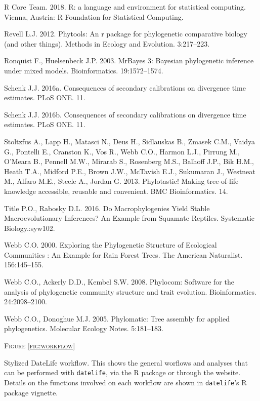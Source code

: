 \documentclass[]{article}
\begin{document}
\leavevmode\hypertarget{ref-RCoreTeam2018}{}%
R Core Team. 2018. R: a language and environment for statistical computing. Vienna, Austria: R Foundation for Statistical Computing.

\leavevmode\hypertarget{ref-Revell2012}{}%
Revell L.J. 2012. Phytools: An r package for phylogenetic comparative biology (and other things). Methods in Ecology and Evolution. 3:217--223.

\leavevmode\hypertarget{ref-Ronquist2003}{}%
Ronquist F., Huelsenbeck J.P. 2003. MrBayes 3: Bayesian phylogenetic inference under mixed models. Bioinformatics. 19:1572--1574.

\leavevmode\hypertarget{ref-schenk2016sec}{}%
Schenk J.J. 2016a. Consequences of secondary calibrations on divergence time estimates. PLoS ONE. 11.

\leavevmode\hypertarget{ref-Schenk2016}{}%
Schenk J.J. 2016b. Consequences of secondary calibrations on divergence time estimates. PLoS ONE. 11.

\leavevmode\hypertarget{ref-Stoltzfus2013}{}%
Stoltzfus A., Lapp H., Matasci N., Deus H., Sidlauskas B., Zmasek C.M., Vaidya G., Pontelli E., Cranston K., Vos R., Webb C.O., Harmon L.J., Pirrung M., O'Meara B., Pennell M.W., Mirarab S., Rosenberg M.S., Balhoff J.P., Bik H.M., Heath T.A., Midford P.E., Brown J.W., McTavish E.J., Sukumaran J., Westneat M., Alfaro M.E., Steele A., Jordan G. 2013. Phylotastic! Making tree-of-life knowledge accessible, reusable and convenient. BMC Bioinformatics. 14.

\leavevmode\hypertarget{ref-title2016macrophylogenies}{}%
Title P.O., Rabosky D.L. 2016. Do Macrophylogenies Yield Stable Macroevolutionary Inferences? An Example from Squamate Reptiles. Systematic Biology.:syw102.

\leavevmode\hypertarget{ref-Webb2000}{}%
Webb C.O. 2000. Exploring the Phylogenetic Structure of Ecological Communities : An Example for Rain Forest Trees. The American Naturalist. 156:145--155.

\leavevmode\hypertarget{ref-Webb2008}{}%
Webb C.O., Ackerly D.D., Kembel S.W. 2008. Phylocom: Software for the analysis of phylogenetic community structure and trait evolution. Bioinformatics. 24:2098--2100.

\leavevmode\hypertarget{ref-webb2005phylomatic}{}%
Webb C.O., Donoghue M.J. 2005. Phylomatic: Tree assembly for applied phylogenetics. Molecular Ecology Notes. 5:181--183.

\newpage

\begin{center}
\textsc{Figure \ref{fig:workflow}}
\end{center}
Stylized DateLife workflow. This shows the general worflows and analyses that can be performed with \texttt{datelife}, via the R package or through the website. Details on the functions involved on each workflow are shown in \texttt{datelife}'s R package vignette.
\end{document}
